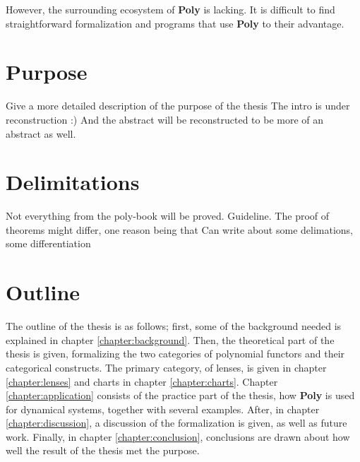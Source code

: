 However, the surrounding ecosystem of \textbf{Poly} is lacking. It is difficult to find straightforward formalization and programs that use \textbf{Poly} to their advantage. 

\section{Purpose}
Give a more detailed description of the purpose of the thesis
The intro is under reconstruction :) And the abstract will be reconstructed to be more of an abstract as well.



\section{Delimitations}

Not everything from the poly-book will be proved. Guideline. The proof of theorems might differ, one reason being that 
Can write about some delimations, some differentiation

\section{Outline}
The outline of the thesis is as follows; first, some of the background needed is explained in chapter \ref{chapter:background}. Then, the theoretical part of the thesis is given, formalizing the two categories of polynomial functors and their categorical constructs. The primary category, of lenses, is given in chapter \ref{chapter:lenses} and charts in chapter \ref{chapter:charts}. Chapter \ref{chapter:application} consists of the practice part of the thesis, how \textbf{Poly} is used for dynamical systems, together with several examples. After, in chapter \ref{chapter:discussion}, a discussion of the formalization is given, as well as future work. Finally, in chapter \ref{chapter:conclusion}, conclusions are drawn about how well the result of the thesis met the purpose.



